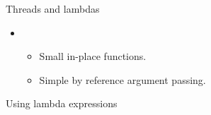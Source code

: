 \begin{frame}[fragile]{Threads and lambdas}
\begin{itemize}
  \item {}
    \begin{itemize}
      \item Small in-place functions.
      \item Simple by reference argument passing.
    \end{itemize}
\end{itemize}

\begin{block}{Using lambda expressions}

\end{block}
\end{frame}
